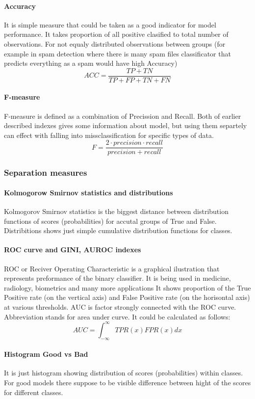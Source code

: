 \documentclass[10pt]{article}\usepackage[]{graphicx}\usepackage[]{color}
\begin{document}
\paragraph{Accuracy}
It is simple measure that could be taken as a good indicator for model 
performance. It takes proportion of all positive clasified to total
number of observations. For not equaly distributed observations between groups 
(for example in spam detection where there is many spam files classificator that
predicts everything as a spam would have high Accuracy)
$$
ACC = \frac{TP +TN}{TP+FP+TN+FN}
$$
\paragraph{F-measure}
F-measure is defined as a combination of Precission and Recall. Both of earlier
described indexes gives some information about model, but using them separtely 
can effect with falling into missclassification for specific types of data. 
$$
  F = \frac{2\cdot precision \cdot recall}{precision + recall}
$$
\subsubsection{Separation measures}
\paragraph{Kolmogorow Smirnov statistics and distributions}
Kolmogorov Smirnov statistics is the biggest distance between distribution 
functions of scores (probabilities) for accutal groups of True and False. 
Distribitions shows just simple cumulative distribution functions for classes.
\paragraph{ROC curve and GINI, AUROC indexes}
ROC or Reciver Operating Characteristic is a graphical ilustration that 
represents preformance of the binary classifier. It is being used in medicine, 
radiology, biometrics and many more applications It shows proportion of the True
Positive rate (on the vertical axis) and False Positive rate (on the horisontal 
axis) at various thresholds. 
AUC is factor strongly connected with the ROC curve. Abbreviation stands for 
area under curve. It could be calculated as follows:
$$
AUC = \int_{-\infty}^{\infty} TPR(x)FPR(x)dx
$$
\paragraph{Histogram Good vs Bad}
It is just histogram showing distribution of scores (probabilities) within 
classes. For good models there suppose to be visible difference between hight of 
the scores for different classes. 
\end{document}
